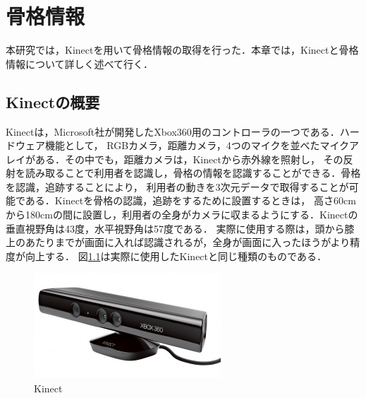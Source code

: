\chapter{骨格情報}\label{abst}
本研究では，Kinectを用いて骨格情報の取得を行った．本章では，Kinectと骨格情報について詳しく述べて行く．

\section{Kinectの概要}
Kinectは，Microsoft社が開発したXbox360用のコントローラの一つである．ハードウェア機能として，
RGBカメラ，距離カメラ，4つのマイクを並べたマイクアレイがある．その中でも，距離カメラは，Kinectから赤外線を照射し，
その反射を読み取ることで利用者を認識し，骨格の情報を認識することができる．骨格を認識，追跡することにより，
利用者の動きを3次元データで取得することが可能である．Kinectを骨格の認識，追跡をするために設置するときは，
高さ60cmから180cmの間に設置し，利用者の全身がカメラに収まるようにする．Kinectの垂直視野角は43度，水平視野角は57度である．
実際に使用する際は，頭から膝上のあたりまでが画面に入れば認識されるが，全身が画面に入ったほうがより精度が向上する．
図\ref{fig:Kinect}は実際に使用したKinectと同じ種類のものである．

\begin{figure}[htbp]
  \begin{center}
    \includegraphics[clip,width=7.0cm]{./images/Kinect.jpg}
    \caption{Kinect}
    \label{fig:Kinect}
  \end{center}
\end{figure}

\newpage

